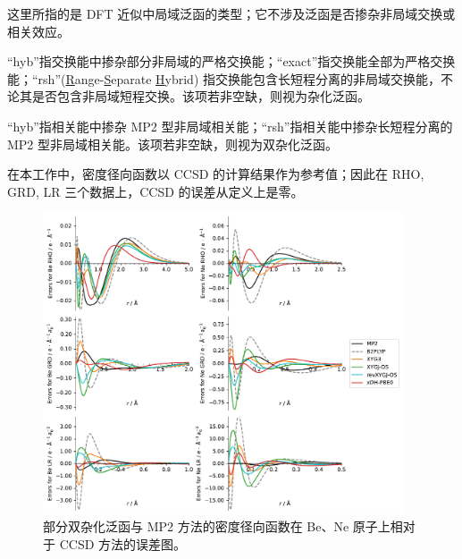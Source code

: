 \begin{landscape}
\small
\vspace{-1em}
\par\noindent{} 这里所指的是 DFT 近似中局域泛函的类型；它不涉及泛函是否掺杂非局域交换或相关效应。
\par\noindent{} “hyb”指交换能中掺杂部分非局域的严格交换能；“exact”指交换能全部为严格交换能；“rsh”(\underline{R}ange-\underline{S}eparate \underline{H}ybrid) 指交换能包含长短程分离的非局域交换能，不论其是否包含非局域短程交换。该项若非空缺，则视为杂化泛函。
\par\noindent{} “hyb”指相关能中掺杂 MP2 型非局域相关能；“rsh”指相关能中掺杂长短程分离的 MP2 型非局域相关能。该项若非空缺，则视为双杂化泛函。
\par\noindent{} 在本工作中，密度径向函数以 CCSD 的计算结果作为参考值；因此在 RHO, GRD, LR 三个数据上，CCSD 的误差从定义上是零。
\end{landscape}

\newpage

\begin{figure}[hp]
    \centering
    \caption{部分双杂化泛函与 MP2 方法的密度径向函数在 Be、Ne 原子上相对于 CCSD 方法的误差图。}
    \label{fig.supp-fig-s1}
    \includegraphics[width=0.95\textwidth]{assets/supp-fig-s1.pdf}
\end{figure}

\newpage

